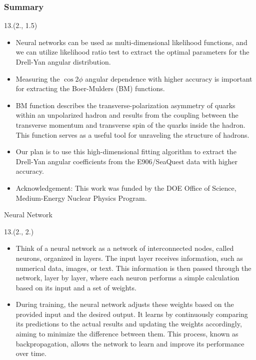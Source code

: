 \documentclass[12pt, xcolor={dvipsnames}, aspectratio = 169, sans,mathserif]{beamer}
\newenvironment{List}[2]
{\begin{textblock}{#1}#2
\begin{itemize}}
{\end{itemize}
\end{textblock}}
\begin{document}
\begin{frame}
\frametitle{Summary}

\begin{List}{13.}{(2., 1.5)}

  \item Neural networks can be used as multi-dimensional likelihood functions, and we can utilize likelihood ratio test
  to extract the optimal parameters for the Drell-Yan angular distribution.

  \item Measuring the $\cos2\phi$ angular dependence with higher accuracy is important for extracting the Boer-Mulders
  (BM) functions.

  \item BM function describes the transverse-polarization asymmetry of quarks within an unpolarized hadron and results
  from the coupling between the transverse momentum and transverse spin of the quarks inside the hadron. This function
  serves as a useful tool for unraveling the structure of hadrons.

  \item Our plan is to use this high-dimensional fitting algorithm to extract the Drell-Yan angular coefficients from the
  E906/SeaQuest data with higher accuracy.

  \item Acknowledgement: This work was funded by the DOE Office of Science, Medium-Energy Nuclear Physics Program.

\end{List}

\end{frame}

\begin{frame}{Neural Network}

\begin{List}{13.}{(2., 2.)}

  \item Think of a neural network as a network of interconnected nodes, called neurons, organized in layers. The input
  layer receives information, such as numerical data, images, or text. This information is then passed through the network,
  layer by layer, where each neuron performs a simple calculation based on its input and a set of weights.

  \item During training, the neural network adjusts these weights based on the provided input and the desired output.
  It learns by continuously comparing its predictions to the actual results and updating the weights accordingly, aiming
  to minimize the difference between them. This process, known as backpropagation, allows the network to learn and improve
  its performance over time.

\end{List}

\end{frame}
\end{document}
